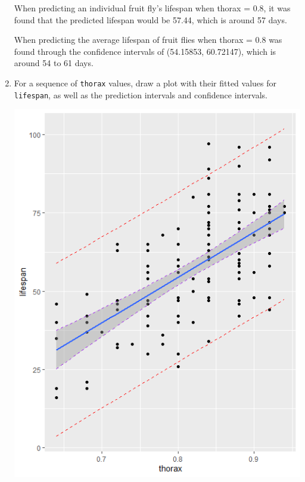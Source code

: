 \documentclass[12pt,letterpaper]{article}
\begin{document}
\begin{enumerate}


When predicting an individual fruit fly's lifespan when thorax = 0.8, it was found that the predicted lifespan would be 57.44, which is around 57 days.

When predicting the average lifespan of fruit flies when thorax = 0.8 was found through the confidence intervals of (54.15853, 60.72147), which is around 54 to 61 days.
	
			\vspace{3cm}
	\item	For a sequence of \texttt{thorax} values, draw a plot with their fitted values for \texttt{lifespan}, as well as the prediction intervals and confidence intervals.

\includegraphics{Q7}



\end{enumerate}
\end{document}
